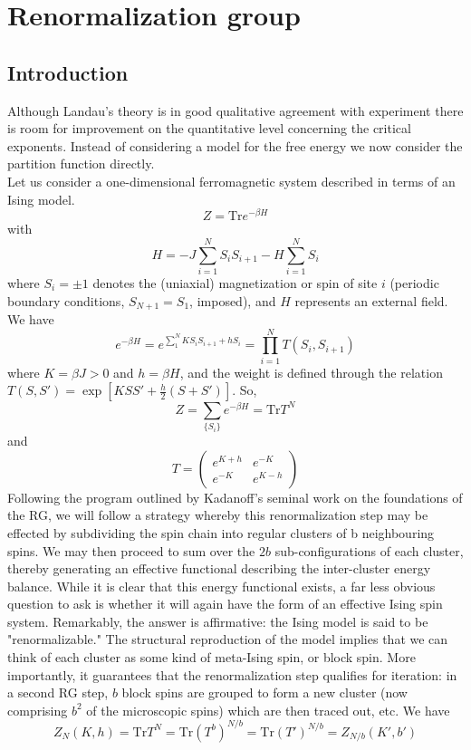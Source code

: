 \documentclass[cyan]{elegantnote}
\begin{document}
\section{Renormalization group}
\subsection{Introduction}
Although Landau's theory is in good qualitative agreement with experiment there is room for improvement on the quantitative level concerning the critical exponents.
Instead of considering a model for the free energy we now consider the partition function directly. 
\\
Let us consider a one-dimensional ferromagnetic system described in terms of an Ising model.
\[Z = \mathrm{Tr}e^{-\beta H}\]
with
\[H = -J\sum_{i=1}^N S_i S_{i+1} - H\sum_{i=1}^N S_i\]
where $S_i = \pm 1$ denotes the (uniaxial) magnetization or spin of site $i$ (periodic boundary conditions, $S_{N+1} = S_1$, imposed), and $H$ represents an external field. We have
\[e^{-\beta H} = e^{\sum_{1}^N KS_iS_{i+1} + hS_i} = \prod_{i=1}^N T(S_i,S_{i+1})\]
where $K = \beta J > 0$ and $h = \beta H$, and the weight is defined through the relation $T(S,S') = \exp[KSS' + \frac{h}{2}(S+S')]$. So,
\[Z = \sum_{\{S_i\}} e^{-\beta H} = \mathrm{Tr}T^N\]
and
\[T = \begin{pmatrix}
e^{K+h} & e^{-K} \\ e^{-K} & e^{K-h}
\end{pmatrix}\]
Following the program outlined by Kadanoff's seminal work on the foundations of the RG, we will follow a strategy whereby this renormalization step may be effected by subdividing the spin chain into regular clusters of b neighbouring spins. We may then proceed to sum over the $2b$ sub-configurations of each cluster, thereby generating an effective functional describing the inter-cluster energy balance. 
While it is clear that this energy functional exists, a far less obvious question to ask is whether it will again have the form of an effective Ising spin system. Remarkably, the answer is affirmative: the Ising model is said to be "renormalizable." 
The structural reproduction of the model implies that we can think of each cluster as some kind of meta-Ising spin, or block spin. More importantly, it guarantees that the renormalization step qualifies for iteration: in a second RG step, $b$ block spins are grouped to form a new cluster (now comprising $b^2$ of the microscopic spins) which are then traced out, etc. We have
\[Z_{N}(K,h) = \mathrm{Tr} T^N = \mathrm{Tr} (T^b)^{N/b} =\mathrm{Tr} (T')^{N/b} = Z_{N/b}(K',b')\]
\end{document}
